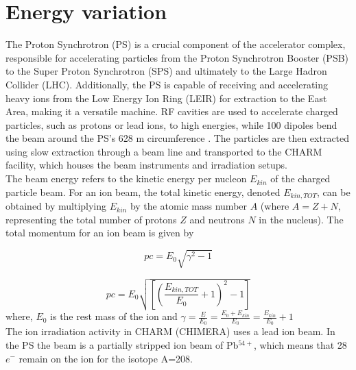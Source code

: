 \documentclass{cernatsnote}
\begin{document}
\section{Energy variation}

The Proton Synchrotron (PS) is a crucial component of the accelerator complex, responsible for accelerating particles from the Proton Synchrotron Booster (PSB) to the Super Proton Synchrotron (SPS) and ultimately to the Large Hadron Collider (LHC). Additionally, the PS is capable of receiving and accelerating heavy ions from the Low Energy Ion Ring (LEIR) for extraction to the East Area, making it a versatile machine. RF cavities are used to accelerate charged particles, such as protons or lead ions, to high energies, while 100 dipoles bend the beam around the PS's 628 m circumference \cite{gilardoni_fifty_2011}. The particles are then extracted using slow extraction \cite{fraser_feasibility_2022} through a beam line and transported to the CHARM facility, which houses the beam instruments and irradiation setups.
\\

The beam energy refers to the kinetic energy per nucleon $E_{kin}$ of the charged particle beam. For an ion beam, the total kinetic energy, denoted $E_{kin, TOT}$, can be obtained by multiplying $E_{kin}$ by the atomic mass number $A$ (where $A = Z + N$, representing the total number of protons $Z$ and neutrons $N$ in the nucleus). The total momentum for an ion beam is given by \cite{chao_handbook_2013}

$$pc={E_{0}\sqrt{\gamma^{2}-1}}$$

$$pc = E_{0}\sqrt{\left [ \left( \frac{E_{kin, TOT}}{E_{0}}+1\right )^{2}-1\right ]}$$
where, $E_{0}$ is the rest mass of the ion and $\gamma=\frac{E}{E_{0}}=\frac{E_{0}+E_{kin}}{E_{0}} = \frac{E_{kin}}{E_{0}}+1$
\\

The ion irradiation activity in CHARM (CHIMERA) uses a lead ion beam. In the PS the beam is a partially stripped ion beam of Pb$^{54+}$, which means that 28 $e^{-}$ remain on the ion for the isotope A=208.
\\
\end{document}
